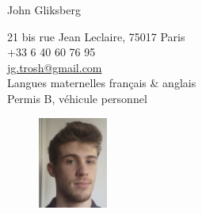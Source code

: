 \documentclass[a4paper,10pt]{article}
\begin{document}

{\Large John \sc Gliksberg}
\hrulefill\\[-.47cm]
\begin{minipage}{0.8\textwidth}
\begin{flushleft}
\vspace{.5cm}
21 bis rue Jean Leclaire, 75017 Paris\\[.2cm]
+33 6 40 60 76 95\\
\href{mailto:jg.trosh@gmail.com}
{jg.trosh@gmail.com}\\[.2cm]
Langues maternelles français \& anglais\\
Permis B, véhicule personnel
\end{flushleft}
\end{minipage}%
\begin{minipage}{0.2\textwidth}
\begin{figure}[H]
\begin{flushright}
\includegraphics[height=3cm]{johnpic}
\end{flushright}
\end{figure}
\end{minipage}\\

\begin{center}
\end{center}
\vspace{.3cm}

\end{document}
